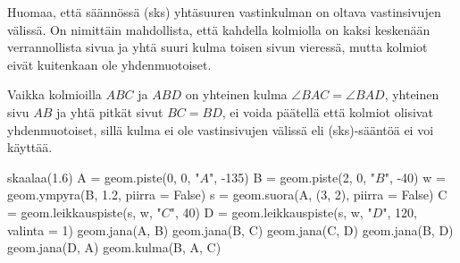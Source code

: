 Huomaa, että säännössä (sks) yhtäsuuren vastinkulman on oltava vastinsivujen välissä. On
nimittäin mahdollista, että kahdella kolmiolla on kaksi keskenään verrannollista sivua
ja yhtä suuri kulma toisen sivun vieressä, mutta kolmiot eivät kuitenkaan ole yhdenmuotoiset.

\begin{esimerkki}
Vaikka kolmioilla $ABC$ ja $ABD$ on yhteinen kulma $\angle BAC = \angle BAD$, yhteinen sivu $AB$ ja yhtä pitkät sivut $BC = BD$, ei voida päätellä että kolmiot olisivat yhdenmuotoiset, sillä kulma ei ole vastinsivujen välissä eli (sks)-sääntöä ei voi käyttää.

\begin{kuva}
skaalaa(1.6)
A = geom.piste(0, 0, "$A$", -135)
B = geom.piste(2, 0, "$B$", -40)
w = geom.ympyra(B, 1.2, piirra = False)
s = geom.suora(A, (3, 2), piirra = False)
C = geom.leikkauspiste(s, w, "$C$", 40)
D = geom.leikkauspiste(s, w, "$D$", 120, valinta = 1)
geom.jana(A, B)
geom.jana(B, C)
geom.jana(C, D)
geom.jana(B, D)
geom.jana(D, A)
geom.kulma(B, A, C)
\end{kuva}

\end{esimerkki}
